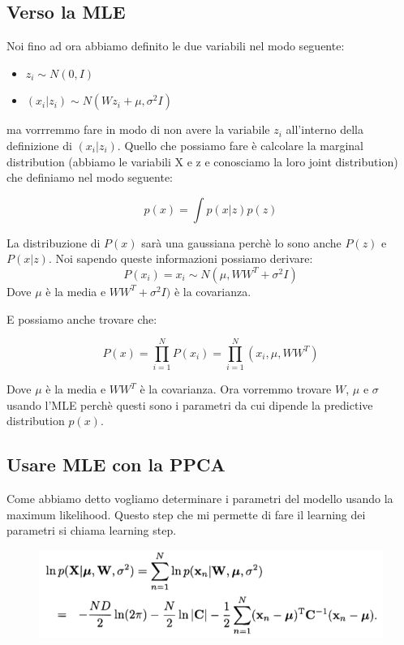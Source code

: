 \documentclass[14pt]{extreport}
\begin{document}
\subsection{Verso la MLE}

Noi fino ad ora abbiamo definito le due variabili nel modo seguente:

\begin{itemize}
\item $z_i \sim N(0, I)$
\item $(x_i | z_i) \sim N(Wz_i + \mu, \sigma^2I)$
\end{itemize}

ma vorrremmo fare in modo di non avere la variabile $z_i$ all'interno della definizione di $(x_i | z_i)$. 
Quello che possiamo fare è calcolare la marginal distribution (abbiamo le variabili X e z e conosciamo la loro joint distribution) che definiamo nel modo seguente:

$$p(x) = \int p(x|z)p(z)$$

La distribuzione di $P(x)$ sarà una gaussiana perchè lo sono anche $P(z)$ e $P(x|z)$. Noi sapendo queste informazioni possiamo derivare:
$$P(x_i) = x_i \sim N(\mu, WW^T + \sigma^2I)$$
Dove $\mu$ è la media e $WW^T + \sigma^2I)$ è la covarianza.

E possiamo anche trovare che:

$$P(x) = \prod_{i=1}^N P(x_i) = \prod_{i=1}^N (x_i, \mu, WW^T)$$

Dove $\mu$ è la media e $WW^T$ è la covarianza.
Ora vorremmo trovare $W$, $\mu$ e $\sigma$ usando l'MLE perchè questi sono i parametri da cui dipende la predictive distribution $p(x)$.

\subsection{Usare MLE con la PPCA}

Come abbiamo detto vogliamo determinare i parametri del modello usando la maximum likelihood. Questo step che mi permette di fare il learning dei parametri
si chiama learning step. 

\begin{figure}[H] 
\centering
\includegraphics[width=0.7\linewidth]{485.jpeg}
\end{figure}
\end{document}

